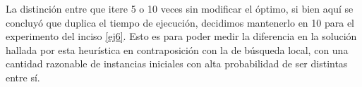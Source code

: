La distinci\'on entre que itere 5 o 10 veces sin modificar el \'optimo, si bien aqu\'i se concluy\'o que duplica el tiempo de ejecuci\'on, decidimos mantenerlo   en 10 para el experimento del inciso \ref{ej6}. Esto es para poder medir la  diferencia en la soluci\'on hallada por esta heur\'istica en contraposici\'on con la de b\'usqueda local, con una cantidad razonable de instancias iniciales con alta probabilidad de ser distintas entre s\'i.

